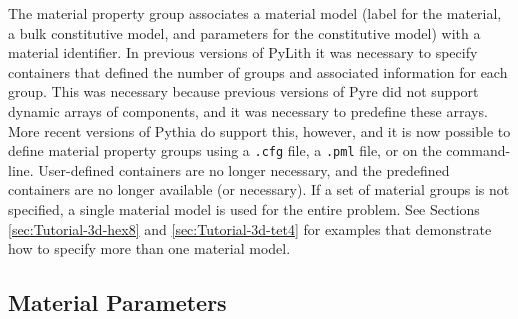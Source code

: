 The material property group associates a material model (label for
the material, a bulk constitutive model, and parameters for the constitutive
model) with a material identifier. In previous versions of PyLith
it was necessary to specify containers that defined the number of
groups and associated information for each group. This was necessary
because previous versions of Pyre did not support dynamic arrays of
components, and it was necessary to predefine these arrays. More recent
versions of Pythia do support this, however, and it is now possible
to define material property groups using a \texttt{.cfg} file, a \texttt{.pml}
file, or on the command-line. User-defined containers are no longer
necessary, and the predefined containers are no longer available (or
necessary). If a set of material groups is not specified, a single
material model is used for the entire problem. See Sections \ref{sec:Tutorial-3d-hex8}
and \ref{sec:Tutorial-3d-tet4} for examples that demonstrate how
to specify more than one material model.


\subsection{\label{sec:material:parameters}Material Parameters}

